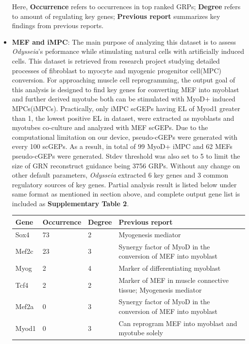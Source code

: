\documentclass[fleqn,10pt]{wlscirep}
\begin{document}
\begin{itemize}
Here, \textbf{Occurrence} refers to occurrences in top ranked GRPs; \textbf{Degree} refers to amount of regulating key genes; \textbf{Previous report} summarizes key findings from previous reports.

\item \textbf{MEF and iMPC}:
The main purpose of analyzing this dataset is to assess \emph{Odysseia}'s peformance while stimulating natural cells with artificially induced cells.
This dataset is retrieved from research project studying detailed processes of fibroblast to myocyte and myogenic progenitor cell(MPC) conversion.\cite{mef_iMPC_ETH}
For approaching muscle cell reprogramming, the output goal of this analysis is designed to find key genes for converting MEF into myoblast and further derived myotube both can be stimulated with MyoD+ induced MPCs(iMPCs)\cite{mpc_as_myoblast}.
Practically, only iMPC scGEPs having EL of Myod1 greater than 1, the lowest positive EL in dataset, were extracted as myoblasts and myotubes co-culture and analyzed with MEF scGEPs.
Due to the computational limitation on our device, pseudo-cGEPs were generated with every 100 scGEPs.
As a result, in total of 99 MyoD+ iMPC and 62 MEFs pseudo-cGEPs were generated.
Stdev threshold was also set to 5 to limit the size of GRN reconstruct guidance being 3756 GRPs.
Without any change on other default parameters, \emph{Odysseia} extracted 6 key genes and 3 common regulatory sources of key genes.
Partial analysis result is listed below under same format as mentioned in section above, and complete output gene list is included as \textbf{Supplementary Table 2}.

\begin{table}[ht]
\centering
\begin{tabular}{|l|l|l|l|}
\hline
\textbf{Gene} & \textbf{Occurrence} & \textbf{Degree} & \textbf{Previous report}  \\
\hline
Sox4 & 73 & 2 & Myogenesis mediator\cite{sox4_2013, myogenic_repro_2018} \\
\hline
Mef2c & 23 & 3 & Synergy factor of MyoD in the conversion of MEF into myoblast\cite{mef2_2017, mef2_skeletal}\\
\hline
Myog & 2 & 4 & Marker of differentiating myoblast\cite{myog_1996, myog_2017} \\
\hline
Tcf4 & 2 & 2 & Marker of MEF in muscle connective tissue; Myogenesis mediator\cite{tcf4_2011, tcf4_2016, tcf4_2017}\\
\hline
Mef2a & 0 & 3 & Synergy factor of MyoD in the conversion of MEF into myoblast\cite{mef2_2017, mef2_skeletal}\\
\hline
Myod1 & 0 & 3 & Can reprogram MEF into myoblast and myotube solely\cite{mef_iMPC_ETH, myod_1990} \\
\hline
\end{tabular}
\end{table}


\end{itemize}
\end{document}

